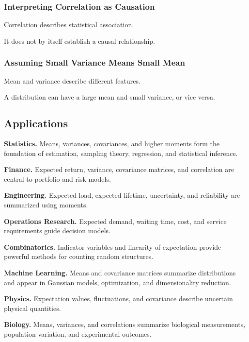 \subsubsection{Interpreting Correlation as Causation}

Correlation describes statistical association.

It does not by itself establish a causal relationship.

\subsubsection{Assuming Small Variance Means Small Mean}

Mean and variance describe different features.

A distribution can have a large mean and small variance, or vice versa.

\subsection{Applications}
\label{subsec:expectation-moments-applications}

\begin{applicationbox}

\textbf{Statistics.}
Means, variances, covariances, and higher moments form the foundation of
estimation, sampling theory, regression, and statistical inference.

\medskip

\textbf{Finance.}
Expected return, variance, covariance matrices, and correlation are
central to portfolio and risk models.

\medskip

\textbf{Engineering.}
Expected load, expected lifetime, uncertainty, and reliability are
summarized using moments.

\medskip

\textbf{Operations Research.}
Expected demand, waiting time, cost, and service requirements guide
decision models.

\medskip

\textbf{Combinatorics.}
Indicator variables and linearity of expectation provide powerful
methods for counting random structures.

\medskip

\textbf{Machine Learning.}
Means and covariance matrices summarize distributions and appear in
Gaussian models, optimization, and dimensionality reduction.

\medskip

\textbf{Physics.}
Expectation values, fluctuations, and covariance describe uncertain
physical quantities.

\medskip

\textbf{Biology.}
Means, variances, and correlations summarize biological measurements,
population variation, and experimental outcomes.

\end{applicationbox}

